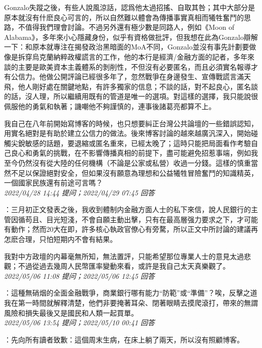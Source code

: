 \documentclass[twocolumn]{ctexart}
\begin{document}
Gonzalo失蹤之後，有些人說風涼話，認爲他太過招搖、自取其咎；其中大部分是原本就沒有什麽良心可言的，所以自然難以體會為傳播事實真相而犧牲奮鬥的思路，不值得我們理會討論。不過另外還有極少數是同路人，例如《Moon of Alabama》，多年來小心隱藏身份，似乎有資格做批評，但我想在此為Gonzalo辯解一下：和原本就專注在揭發政治黑暗面的MoA不同，Gonzalo並沒有事先計劃要做像是拆穿烏克蘭納粹政權謊言的工作，他的本行是經濟/金融方面的記者，多年來談的主要是歐美資本主義體系的剝削性，不但沒有必要匿名，而且必須實名報導才有公信力。他做公開評論已經很多年了，忽然戰爭在身邊發生、宣傳戰謊言滿天飛，他人剛好處在關鍵地點，有許多獨家的信息；不談的話，對不起良心，匿名談的話，沒人理，所以繼續用既有的管道是唯一的選項。對這樣的選擇，我只能說很佩服他的勇氣和執著；譏嘲他不夠謹慎的，連事後諸葛亮都算不上。

我自己在八年前開始寫博客的時候，也只想要糾正台灣公共論壇的一些錯誤認知，用實名絕對是有助於建立公信力的做法。後來博客討論的越來越廣汎深入，開始碰觸尖銳敏感的話題，要退縮或匿名重來，已經太晚了；這時只能把局面看作考驗自己良心和勇氣的挑戰，在不影響傳播真相的前提下，盡可能避免招惹事端，例如我至今仍然沒有從大陸的任何機構（不論是公家或私營）收過一分錢。這樣的慎重當然不足以保證絕對安全，但如果沒有願意為理想和公益犧牲冒險奮鬥的知識精英，一個國家民族還有前途可言嗎？
\\

\textit{\hfill\noindent\small 2022/04/28 14:44 提问；2022/04/29 07:45 回答}

：三月初正文發表之後，我收到體制内金融方面人士的私下來信，說人民銀行的主管因循苟且、目光短淺，不會自願主動出擊，只有在最高層强力要求之下，才可能有動作；然而20大在即，許多核心執政官僚心有旁騖，所以正文中所討論的建議再怎麽合理，只怕短期内不會有結果。

我對中方政壇的内幕毫無所知，無法置評，只能希望那位專業人士的意見太過悲觀；不過從過去幾周人民幣匯率變動來看，或許是我自己太天真樂觀了。
\\

\textit{\hfill\noindent\small 2022/05/06 11:08 提问；2022/05/06 12:45 回答}

：這種無硝烟的全面金融戰爭，商業銀行哪有能力“防範”或“準備”？唉，反擊之道我在第一時間就解釋清楚，他們非要掩著耳朵、閉著眼睛去摸爬滾打，帶來的無謂風險和損失最後又是國民和人類一起買單。
\\

\textit{\hfill\noindent\small 2022/05/06 13:54 提问；2022/05/10 00:41 回答}

：先向所有讀者致歉：這個周末生病，在床上躺了兩天，所以沒有照顧博客。
\end{document}
